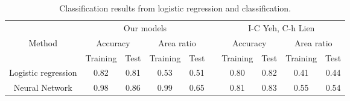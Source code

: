 

\begin{table}[!h]
\label{tab:results_classification}
\caption{Classification results from logistic regression and classification.}
\begin{tabular}{cccccccccc}
                                          & \multicolumn{4}{c}{Our models}                                                                                            &                       & \multicolumn{4}{c}{I-C Yeh, C-h Lien}                                                                                 \\ \cline{1-5} \cline{7-10} 
\multicolumn{1}{|c|}{Method}              & \multicolumn{2}{c|}{Accuracy}                               & \multicolumn{2}{c|}{Area ratio}                             & \multicolumn{1}{c|}{} & \multicolumn{2}{c|}{Accuracy}                             & \multicolumn{2}{c|}{Area ratio}                           \\ \cline{1-5} \cline{7-10} 
\multicolumn{1}{|c|}{}                    & \multicolumn{1}{c|}{Training} & \multicolumn{1}{c|}{Test}   & \multicolumn{1}{c|}{Training} & \multicolumn{1}{c|}{Test}   & \multicolumn{1}{c|}{} & \multicolumn{1}{c|}{Training} & \multicolumn{1}{c|}{Test} & \multicolumn{1}{c|}{Training} & \multicolumn{1}{c|}{Test} \\ \cline{1-5} \cline{7-10} 
\multicolumn{1}{|c|}{Logistic regression} & \multicolumn{1}{c|}{0.82}     & \multicolumn{1}{c|}{0.81}   & \multicolumn{1}{c|}{0.53}     & \multicolumn{1}{c|}{0.51}   & \multicolumn{1}{c|}{} & \multicolumn{1}{c|}{0.80}     & \multicolumn{1}{c|}{0.82} & \multicolumn{1}{c|}{0.41}     & \multicolumn{1}{c|}{0.44} \\ \cline{1-5} \cline{7-10} 
\multicolumn{1}{|c|}{Neural Network}      & \multicolumn{1}{c|}{0.98}   & \multicolumn{1}{c|}{0.86} & \multicolumn{1}{c|}{0.99}   & \multicolumn{1}{c|}{0.65} & \multicolumn{1}{c|}{} & \multicolumn{1}{c|}{0.81}     & \multicolumn{1}{c|}{0.83} & \multicolumn{1}{c|}{0.55}     & \multicolumn{1}{c|}{0.54} \\ \cline{1-5} \cline{7-10} 
\end{tabular}
\end{table}












